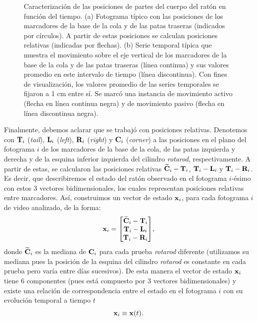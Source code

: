 \begin{figure}[!htbp]
\begin{subfigure}{.64\textwidth}
        \caption{}
    \end{subfigure}
    \caption{Caracterización de las posiciones de partes del cuerpo del ratón en función del tiempo. (a) Fotograma típico con las posiciones de los marcadores de la base de la cola y de las patas traseras (indicados por círculos). A partir de estas posiciones se calculan posiciones relativas (indicadas por flechas). (b) Serie temporal típica que muestra el movimiento sobre el eje vertical de los marcadores de la base de la cola y de las patas traseras (línea continua) y sus valores promedio en este intervalo de tiempo (línea discontinua). Con fines de visualización, los valores promedio de las series temporales se fijaron a 1 cm entre sí. Se marcó una instancia de movimiento activo (flecha en línea continua negra) y de movimiento pasivo (flecha en línea discontinua negra). }
\label{fig:positions_panel}
\end{figure}

Finalmente, debemos aclarar que se trabajó con posiciones relativas. Denotemos con $\vb{T}_i$ (\textit{tail}), $\vb{L}_i$ (\textit{left}), $\vb{R}_i$ (\textit{right}) y $\vb{C}_i$ (\textit{corner}) a las posiciones en el plano del fotograma $i$ de los marcadores de la base de la cola, de las patas izquierda y derecha y de la esquina inferior izquierda del cilindro \textit{rotarod}, respectivamente. A partir de estas, se calcularon las posiciones relativas $\widetilde{\vb{C}}_i - \vb{T}_i$, $\vb{T}_i - \vb{L}_i$ y $\vb{T}_i - \vb{R}_i$. Es decir, que describiremos el estado del ratón observado en el fotograma $i$-ésimo con estos 3 vectores bidimensionales, los cuales representan posiciones relativas entre marcadores. Así, construimos un vector de estado $\vb{x}_i$, para cada fotograma $i$ de video analizado, de la forma:
\begin{equation}
    \vb{x}_i = \mqty[\widetilde{\vb{C}}_i - \vb{T}_i\\ \vb{T}_i - \vb{L}_i\\ \vb{T}_i - \vb{R}_i],
\end{equation}
donde $\widetilde{\vb{C}}_i$ es la mediana de $\vb{C}_i$ para cada prueba \textit{rotarod} diferente (utilizamos su mediana pues la posición de la esquina del cilindro \textit{rotarod} es constante en cada prueba pero varía entre días sucesivos). De esta manera el vector de estado $\vb{x}_i$ tiene 6 componentes (pues está compuesto por 3 vectores bidimensionales) y existe una relación de correspondencia entre el estado en el fotograma $i$ con su evolución temporal a tiempo $t$
\begin{equation}
    \vb{x}_i \equiv \vb{x}(t).
\end{equation}

